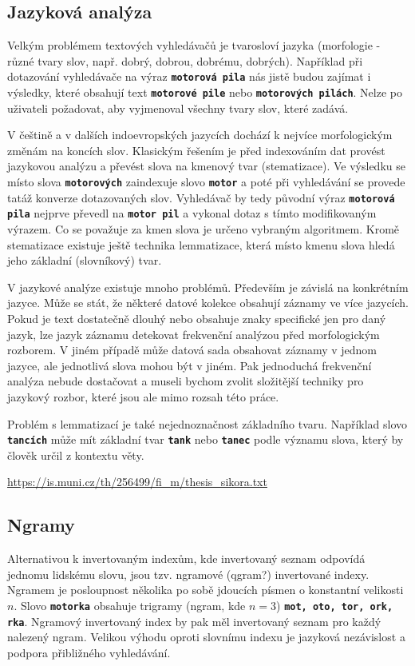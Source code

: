 \documentclass[12pt,letterpaper,oneside,openright]{book}
\newcommand{\bftt}[1]{\texttt{\textbf{#1}}}
\begin{document}
\subsection{Jazyková analýza}
Velkým problémem textových vyhledávačů je tvarosloví jazyka (morfologie - různé
tvary slov, např. dobrý, dobrou, dobrému, dobrých).  Například při dotazování vyhledávače
na výraz \bftt{motorová pila} nás jistě budou zajímat i výsledky, které
obsahují text \bftt{motorové pile} nebo \bftt{motorových pilách}. Nelze po
uživateli požadovat, aby vyjmenoval všechny tvary slov, které zadává.

V češtině a v dalších indoevropských jazycích dochází k nejvíce morfologickým
změnám na koncích slov.  Klasickým řešením je před indexováním dat provést
jazykovou analýzu a převést slova na kmenový tvar (stematizace). Ve výsledku se
místo slova \bftt{motorových} zaindexuje slovo \bftt{motor} a poté při
vyhledávání se provede tatáž konverze dotazovaných slov. Vyhledávač by tedy
původní výraz \bftt{motorová pila} nejprve převedl na \bftt{motor pil} a
vykonal dotaz s tímto modifikovaným výrazem. Co se považuje za kmen slova je
určeno vybraným algoritmem. Kromě stematizace existuje ještě technika
lemmatizace, která místo kmenu slova hledá jeho základní (slovníkový) tvar.

V jazykové analýze existuje mnoho problémů. Především je závislá na konkrétním
jazyce. Může se stát, že některé datové kolekce obsahují záznamy ve více
jazycích. Pokud je text dostatečně dlouhý nebo obsahuje znaky specifické jen
pro daný jazyk, lze jazyk záznamu detekovat frekvenční analýzou před
morfologickým rozborem. V jiném případě může datová sada obsahovat záznamy v
jednom jazyce, ale jednotlivá slova mohou být v jiném. Pak jednoduchá
frekvenční analýza nebude dostačovat a museli bychom zvolit složitější techniky
pro jazykový rozbor, které jsou ale mimo rozsah této práce.

Problém s lemmatizací je také nejednoznačnost základního tvaru. Například slovo
\bftt{tancích} může mít základní tvar \bftt{tank} nebo \bftt{tanec} podle
významu slova, který by člověk určil z kontextu věty.

\url{https://is.muni.cz/th/256499/fi_m/thesis_sikora.txt}

\subsection{Ngramy}
Alternativou k invertovaným indexům, kde invertovaný seznam odpovídá jednomu
lidskému slovu, jsou tzv. ngramové (qgram?) invertované indexy. Ngramem je
posloupnost několika po sobě jdoucích písmen o konstantní velikosti $n$.  Slovo
\bftt{motorka} obsahuje trigramy (ngram, kde $n = 3$) \bftt{mot, oto, tor,
ork, rka}.  Ngramový invertovaný index by pak měl invertovaný seznam pro každý
nalezený ngram. Velikou výhodu oproti slovnímu indexu je jazyková nezávislost a
podpora přibližného vyhledávání.
\end{document}
